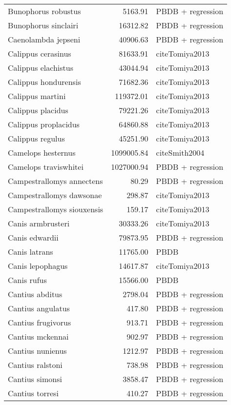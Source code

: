\begin{table}[ht]
\begin{tabular}{lrl}
  Bunophorus robustus & 5163.91 & PBDB + regression \\ 
  Bunophorus sinclairi & 16312.82 & PBDB + regression \\ 
  Caenolambda jepseni & 40906.63 & PBDB + regression \\ 
  Calippus cerasinus & 81633.91 & cite{Tomiya2013} \\ 
  Calippus elachistus & 43044.94 & cite{Tomiya2013} \\ 
  Calippus hondurensis & 71682.36 & cite{Tomiya2013} \\ 
  Calippus martini & 119372.01 & cite{Tomiya2013} \\ 
  Calippus placidus & 79221.26 & cite{Tomiya2013} \\ 
  Calippus proplacidus & 64860.88 & cite{Tomiya2013} \\ 
  Calippus regulus & 45251.90 & cite{Tomiya2013} \\ 
  Camelops hesternus & 1099005.84 & cite{Smith2004} \\ 
  Camelops traviswhitei & 1027000.94 & PBDB + regression \\ 
  Campestrallomys annectens & 80.29 & PBDB + regression \\ 
  Campestrallomys dawsonae & 298.87 & cite{Tomiya2013} \\ 
  Campestrallomys siouxensis & 159.17 & cite{Tomiya2013} \\ 
  Canis armbrusteri & 30333.26 & cite{Tomiya2013} \\ 
  Canis edwardii & 79873.95 & PBDB + regression \\ 
  Canis latrans & 11765.00 & PBDB \\ 
  Canis lepophagus & 14617.87 & cite{Tomiya2013} \\ 
  Canis rufus & 15566.00 & PBDB \\ 
  Cantius abditus & 2798.04 & PBDB + regression \\ 
  Cantius angulatus & 417.80 & PBDB + regression \\ 
  Cantius frugivorus & 913.71 & PBDB + regression \\ 
  Cantius mckennai & 902.97 & PBDB + regression \\ 
  Cantius nunienus & 1212.97 & PBDB + regression \\ 
  Cantius ralstoni & 738.98 & PBDB + regression \\ 
  Cantius simonsi & 3858.47 & PBDB + regression \\ 
  Cantius torresi & 410.27 & PBDB + regression \\ 

\end{tabular}
\end{table}

